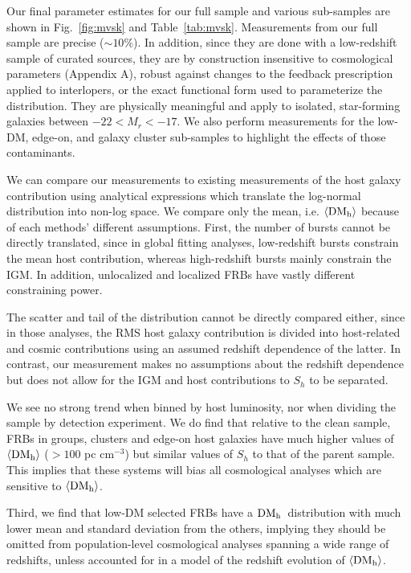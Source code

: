 \documentclass[twocolumn]{aastex631}
\newcommand{\dmh}{\ensuremath{{\rm DM}_\textrm{h}}}
\begin{document}
Our final parameter estimates for our full sample and various sub-samples are shown in Fig.~\ref{fig:mvsk} and Table~\ref{tab:mvsk}. Measurements from our full sample are precise ($\sim 10\%$). In addition, since they are done with a low-redshift sample of curated sources, they are by construction insensitive to cosmological parameters (Appendix A), robust against changes to the feedback prescription applied to interlopers, or the exact functional form used to parameterize the distribution. They are physically meaningful and apply to isolated, star-forming galaxies between $-22 < M_r < -17$. We also perform measurements for the low-DM, edge-on, and galaxy cluster sub-samples to highlight the effects of those contaminants. 

We can compare our measurements to existing measurements of the host galaxy contribution \citep{james2021z,shin2023inferring,connor2024gas} using analytical expressions which translate the log-normal distribution into non-log space. We compare only the mean, i.e. $\langle \dmh\rangle$ because of each methods' different assumptions. First, the number of bursts cannot be directly translated, since in global fitting analyses, low-redshift bursts constrain the mean host contribution, whereas high-redshift bursts mainly constrain the IGM. In addition, unlocalized and localized FRBs have vastly different constraining power.

The scatter and tail of the distribution cannot be directly compared either, since in those analyses, the RMS host galaxy contribution is divided into host-related and cosmic contributions using an assumed redshift dependence of the latter. In contrast, our measurement makes no assumptions about the redshift dependence but does not allow for the IGM and host contributions to $S_h$ to be separated.

We see no strong trend when binned by host luminosity, nor when dividing the sample by detection experiment. We do find that relative to the clean sample, FRBs in groups, clusters and edge-on host galaxies have much higher values of $\langle \dmh\rangle$ ($> 100$ pc cm$^{-3}$) but similar values of $S_h$ to that of the parent sample. This implies that these systems will bias all cosmological analyses which are sensitive to $\langle\dmh\rangle$.

Third, we find that low-DM selected FRBs have a \dmh\ distribution with much lower mean and standard deviation from the others, implying they should be omitted from population-level cosmological analyses spanning a wide range of redshifts, unless accounted for in a model of the redshift evolution of $\langle\dmh\rangle$. 
\end{document}
